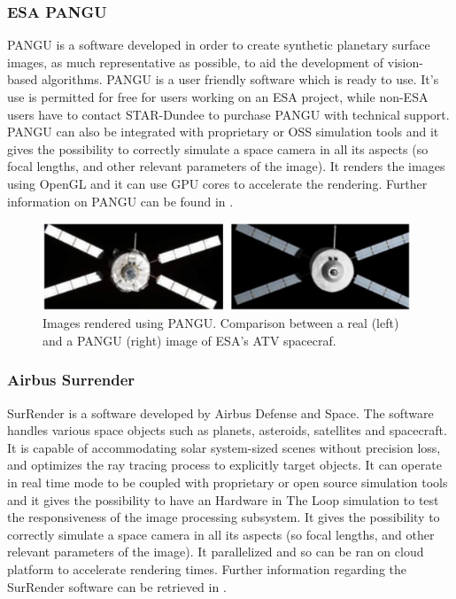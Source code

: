 \subsubsection{ESA PANGU}
PANGU is a software developed in order to create synthetic planetary surface images, as much representative as possible, to aid the development of vision-based algorithms. PANGU is a user friendly software which is ready to use. It's use is permitted for free for users working on an ESA project, while non-ESA users have to contact STAR-Dundee to purchase PANGU with technical support. PANGU can also be integrated with proprietary or OSS simulation tools and it gives the possibility to correctly simulate a space camera in all its aspects (so focal lengths, and other relevant parameters of the image). It renders the images using OpenGL and it can use GPU cores to accelerate the rendering. Further information on PANGU can be found in \cite{10.2514/6.2004-592-389}.

\begin{figure}[htbp]
  \centering
  \includegraphics[width=0.98\textwidth]{gfx/pangu.eps}
  \caption{Images rendered using PANGU. Comparison between a real (left) and a PANGU (right) image of ESA’s ATV spacecraf.}
  \label{fig:PANGU}
\end{figure}

\subsubsection{Airbus Surrender}
SurRender is a software developed by Airbus Defense and Space. The software handles various space objects such as planets, asteroids, satellites and spacecraft. It is capable of accommodating solar system-sized scenes without precision loss, and optimizes the ray tracing process to explicitly target objects. It can operate in real time mode to be coupled with  proprietary or open source simulation tools and it gives the possibility to have an Hardware in The Loop simulation to test the responsiveness of the image processing subsystem. It gives the possibility to correctly simulate a space camera in all its aspects (so focal lengths, and other relevant parameters of the image). It parallelized and so can be ran on cloud platform to accelerate rendering times. Further information regarding the SurRender software can be retrieved in \cite{Brochard2018ScientificIR}.

